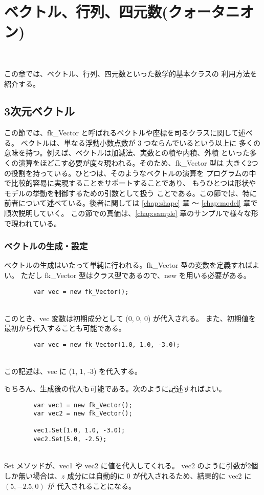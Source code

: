 \chapter{ベクトル、行列、四元数(クォータニオン)} \label{chap:vector} ~

この章では、ベクトル、行列、四元数といった数学的基本クラスの
利用方法を紹介する。

\section{3次元ベクトル}
この節では、fk\_Vector と呼ばれるベクトルや座標を司るクラスに関して述べる。
ベクトルは、単なる浮動小数点数が 3 つならんでいるという以上に
多くの意味を持つ。例えば、ベクトルは加減法、実数との積や内積、外積
といった多くの演算をほどこす必要が度々現われる。そのため、fk\_Vector 型は
大きく2つの役割を持っている。ひとつは、そのようなベクトルの演算を
プログラムの中で比較的容易に実現することをサポートすることであり、
もうひとつは形状やモデルの挙動を制御するための引数として扱う
ことである。この節では、特に前者について述べている。後者に関しては
\ref{chap:shape} 章 〜 \ref{chap:model} 章で順次説明していく。
この節での真価は、\ref{chap:sample} 章のサンプルで様々な形で現われている。

\subsection{ベクトルの生成・設定}
ベクトルの生成はいたって単純に行われる。fk\_Vector 型の変数を定義すればよい。
ただし fk\_Vector 型はクラス型であるので、new を用いる必要がある。
\\
\begin{screen}
\begin{verbatim}
        var vec = new fk_Vector();
\end{verbatim}
\end{screen}
~ \\
このとき、vec 変数は初期成分として (0, 0, 0) が代入される。
また、初期値を最初から代入することも可能である。
\\
\begin{screen}
\begin{verbatim}
        var vec = new fk_Vector(1.0, 1.0, -3.0);
\end{verbatim}
\end{screen}
~ \\
この記述は、vec に (1, 1, -3) を代入する。

もちろん、生成後の代入も可能である。次のように記述すればよい。
\\
\begin{screen}
\begin{verbatim}
        var vec1 = new fk_Vector();
        var vec2 = new fk_Vector();

        vec1.Set(1.0, 1.0, -3.0);
        vec2.Set(5.0, -2.5);
\end{verbatim}
\end{screen}
~ \\
Set メソッドが、vec1 や vec2 に値を代入してくれる。
vec2 のように引数が2個しか無い場合は、\(z\) 成分には自動的に
\(0\) が代入されるため、結果的に vec2 に \((5, -2.5, 0)\) が
代入されることになる。

